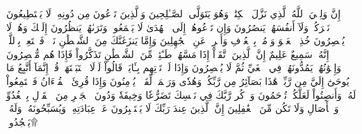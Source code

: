 إِنَّ وَلِـِّۧيَ ٱللَّهُ ٱلَّذِي نَزَّلَ ٱلۡكِتَٰبَۖ وَهُوَ يَتَوَلَّى ٱلصَّـٰلِحِينَ
وَٱلَّذِينَ تَدۡعُونَ مِن دُونِهِۦ لَا يَسۡتَطِيعُونَ نَصۡرَكُمۡ وَلَآ أَنفُسَهُمۡ يَنصُرُونَ
وَإِن تَدۡعُوهُمۡ إِلَى ٱلۡهُدَىٰ لَا يَسۡمَعُواْۖ وَتَرَىٰهُمۡ يَنظُرُونَ إِلَيۡكَ وَهُمۡ لَا يُبۡصِرُونَ
خُذِ ٱلۡعَفۡوَ وَأۡمُرۡ بِٱلۡعُرۡفِ وَأَعۡرِضۡ عَنِ ٱلۡجَٰهِلِينَ
وَإِمَّا يَنزَغَنَّكَ مِنَ ٱلشَّيۡطَٰنِ نَزۡغٞ فَٱسۡتَعِذۡ بِٱللَّهِۚ إِنَّهُۥ سَمِيعٌ عَلِيمٌ
إِنَّ ٱلَّذِينَ ٱتَّقَوۡاْ إِذَا مَسَّهُمۡ طَـٰٓئِفٞ مِّنَ ٱلشَّيۡطَٰنِ تَذَكَّرُواْ فَإِذَا هُم مُّبۡصِرُونَ
وَإِخۡوَٰنُهُمۡ يَمُدُّونَهُمۡ فِي ٱلۡغَيِّ ثُمَّ لَا يُقۡصِرُونَ
وَإِذَا لَمۡ تَأۡتِهِم بِـَٔايَةٖ قَالُواْ لَوۡلَا ٱجۡتَبَيۡتَهَاۚ قُلۡ إِنَّمَآ أَتَّبِعُ مَا يُوحَىٰٓ إِلَيَّ مِن رَّبِّيۚ هَٰذَا بَصَآئِرُ مِن رَّبِّكُمۡ وَهُدٗى وَرَحۡمَةٞ لِّقَوۡمٖ يُؤۡمِنُونَ
وَإِذَا قُرِئَ ٱلۡقُرۡءَانُ فَٱسۡتَمِعُواْ لَهُۥ وَأَنصِتُواْ لَعَلَّكُمۡ تُرۡحَمُونَ
وَٱذۡكُر رَّبَّكَ فِي نَفۡسِكَ تَضَرُّعٗا وَخِيفَةٗ وَدُونَ ٱلۡجَهۡرِ مِنَ ٱلۡقَوۡلِ بِٱلۡغُدُوِّ وَٱلۡأٓصَالِ وَلَا تَكُن مِّنَ ٱلۡغَٰفِلِينَ
إِنَّ ٱلَّذِينَ عِندَ رَبِّكَ لَا يَسۡتَكۡبِرُونَ عَنۡ عِبَادَتِهِۦ وَيُسَبِّحُونَهُۥ وَلَهُۥ يَسۡجُدُونَۤ۩